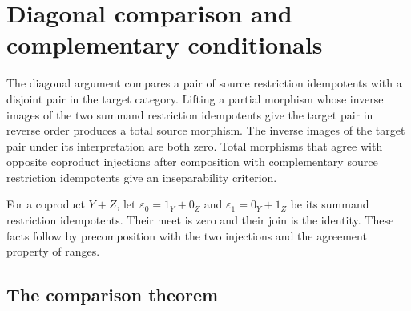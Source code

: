 \section{Diagonal comparison and complementary conditionals}\label{sec:lifting}

The diagonal argument compares a pair of source restriction idempotents
with a disjoint pair in the target category. Lifting a partial morphism
whose inverse images of the two summand restriction idempotents give the target
pair in reverse order produces a total source morphism. The inverse images
of the target pair under its interpretation are both zero.
Total morphisms that agree with opposite coproduct injections after
composition with complementary source restriction idempotents give an
inseparability criterion.

For a coproduct $Y+Z$, let
$\varepsilon_0=1_Y+0_Z$ and $\varepsilon_1=0_Y+1_Z$ be its summand
restriction idempotents. Their meet is zero and their join is the identity. These facts
follow by precomposition with the two injections and the agreement
property of ranges.

\subsection{The comparison theorem}

